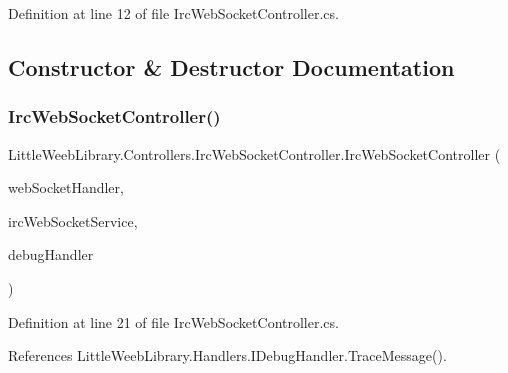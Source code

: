Definition at line 12 of file Irc\+Web\+Socket\+Controller.\+cs.



\subsection{Constructor \& Destructor Documentation}
\mbox{\label{class_little_weeb_library_1_1_controllers_1_1_irc_web_socket_controller_a6668898a19272a602ab6ae79a29caaaa}} 
\subsubsection{\texorpdfstring{Irc\+Web\+Socket\+Controller()}{IrcWebSocketController()}}
{\footnotesize\ttfamily Little\+Weeb\+Library.\+Controllers.\+Irc\+Web\+Socket\+Controller.\+Irc\+Web\+Socket\+Controller (\begin{DoxyParamCaption}\item[{\mbox{\hyperlink{interface_little_weeb_library_1_1_handlers_1_1_i_web_socket_handler}{I\+Web\+Socket\+Handler}}}]{web\+Socket\+Handler,  }\item[{\mbox{\hyperlink{interface_little_weeb_library_1_1_services_1_1_i_irc_web_socket_service}{I\+Irc\+Web\+Socket\+Service}}}]{irc\+Web\+Socket\+Service,  }\item[{\mbox{\hyperlink{interface_little_weeb_library_1_1_handlers_1_1_i_debug_handler}{I\+Debug\+Handler}}}]{debug\+Handler }\end{DoxyParamCaption})}



Definition at line 21 of file Irc\+Web\+Socket\+Controller.\+cs.



References Little\+Weeb\+Library.\+Handlers.\+I\+Debug\+Handler.\+Trace\+Message().


